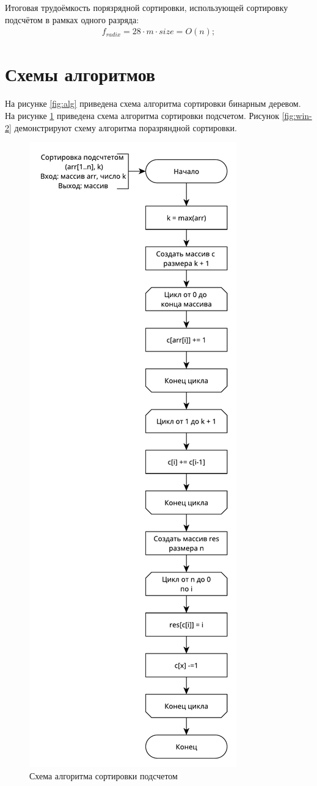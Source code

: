 Итоговая трудоёмкость порязрядной сортировки, использующей сортировку подсчётом в рамках одного разряда: 
\begin{align}
	f_{radix} = 28 \cdot m \cdot size = O(n);
\end{align}

\section{Схемы алгоритмов}
На рисунке \ref{fig:alg} приведена схема алгоритма сортировки бинарным деревом. На рисунке \ref{fig:win-1} приведена схема алгоритма сортировки подсчетом. Рисунок  
\ref{fig:win-2} демонстрируют схему алгоритма поразряндной сортировки.\newpage

\begin{figure}[ht!]
	\centering
	\includegraphics[width=0.45\linewidth]{assets/count.pdf}
	\caption{Схема алгоритма сортировки подсчетом}
	\label{fig:win-1}
\end{figure}

